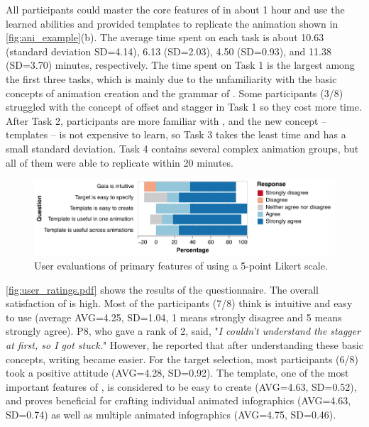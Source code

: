 All participants could master the core features of \gaia{} in about 1 hour and use the learned abilities and provided templates to replicate the animation shown in \autoref{fig:ani_example}(b).
The average time spent on each task is about 10.63 (standard deviation SD=4.14), 6.13 (SD=2.03), 4.50 (SD=0.93), and 11.38 (SD=3.70) minutes, respectively.
The time spent on Task 1 is the largest among the first three tasks, which is mainly due to the unfamiliarity with the basic concepts of animation creation and the grammar of \gaia{}.
Some participants (3/8) struggled with the concept of offset and stagger in Task 1 so they cost more time.
After Task 2, participants are more familiar with \gaia{}, and the new concept -- templates -- is not expensive to learn, so Task 3 takes the least time and has a small standard deviation.
Task 4 contains several complex animation groups, but all of them were able to replicate within 20 minutes.

\begin{figure}[t]
    \centering
    \includegraphics[width=\linewidth]{figs/user_ratings.pdf}
    \caption{User evaluations of primary features of \gaia{} using a 5-point Likert scale.}
    \label{fig:user_ratings.pdf}
\end{figure}

\autoref{fig:user_ratings.pdf} shows the results of the questionnaire.
The overall satisfaction of \gaia{} is high.
Most of the participants (7/8) think \gaia{} is intuitive and easy to use (average AVG=4.25, SD=1.04, 1 means strongly disagree and 5 means strongly agree).
P8, who gave a rank of 2, said, "\textit{I couldn't understand the stagger at first, so I got stuck.}"
However, he reported that after understanding these basic concepts, writing \gaia{} became easier.
For the target selection, most participants (6/8) took a positive attitude (AVG=4.28, SD=0.92).
The template, one of the most important features of \gaia{}, is considered to be easy to create (AVG=4.63, SD=0.52), and proves beneficial for crafting individual animated infographics (AVG=4.63, SD=0.74) as well as multiple animated infographics (AVG=4.75, SD=0.46).

